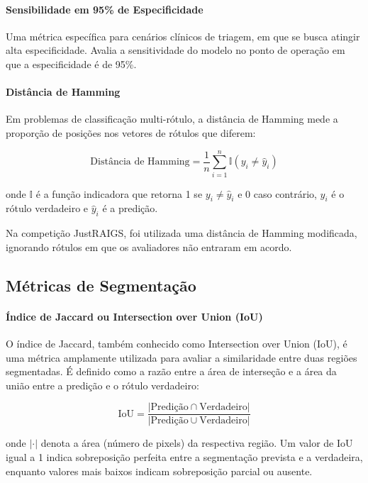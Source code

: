 \documentclass[12pt]{article}
\begin{document}
\paragraph{Sensibilidade em 95\% de Especificidade} Uma métrica específica para cenários clínicos de triagem, em que se busca atingir alta especificidade. Avalia a sensitividade do modelo no ponto de operação em que a especificidade é de 95\%.

\paragraph{Distância de Hamming}  
Em problemas de classificação multi-rótulo, a distância de Hamming mede a proporção de posições nos vetores de rótulos que diferem:

\begin{equation}
\text{Distância de Hamming} = \frac{1}{n} \sum_{i=1}^{n} \mathbb{I}(y_i \neq \hat{y}_i)
\end{equation}

onde \( \mathbb{I} \) é a função indicadora que retorna 1 se \( y_i \neq \hat{y}_i \) e 0 caso contrário, \( y_i \) é o rótulo verdadeiro e \( \hat{y}_i \) é a predição.

Na competição JustRAIGS, foi utilizada uma distância de Hamming modificada, ignorando rótulos em que os avaliadores não entraram em acordo.


\subsection{Métricas de Segmentação}
\label{sec:metrics_segmentation}

\paragraph{Índice de Jaccard ou Intersection over Union (IoU)}
O índice de Jaccard, também conhecido como Intersection over Union (IoU), é uma métrica amplamente utilizada para avaliar a similaridade entre duas regiões segmentadas. É definido como a razão entre a área de interseção e a área da união entre a predição e o rótulo verdadeiro:

\begin{equation}
\text{IoU} = \frac{|\text{Predição} \cap \text{Verdadeiro}|}{|\text{Predição} \cup \text{Verdadeiro}|}
\end{equation}

onde \( |\cdot| \) denota a área (número de pixels) da respectiva região. Um valor de IoU igual a 1 indica sobreposição perfeita entre a segmentação prevista e a verdadeira, enquanto valores mais baixos indicam sobreposição parcial ou ausente.
\end{document}
